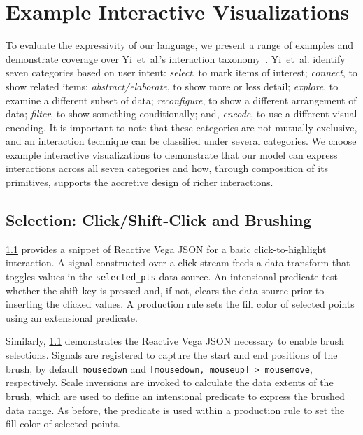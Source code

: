 \section{Example Interactive Visualizations}
\label{sec:vg:examples}

To evaluate the expressivity of our language, we present a range of examples and
demonstrate coverage over Yi~et~al.'s interaction
taxonomy~\cite{yi:understanding}. Yi~et~al. identify seven categories based on
user intent: \emph{select}, to mark items of interest; \emph{connect}, to show
related items; \emph{abstract/elaborate}, to show more or less detail;
\emph{explore}, to examine a different subset of data; \emph{reconfigure}, to
show a different arrangement of data; \emph{filter}, to show something
conditionally; and, \emph{encode}, to use a different visual encoding. It is
important to note that these categories are not mutually exclusive, and an
interaction technique can be classified under several categories. We choose
example interactive visualizations to demonstrate that our model can express
interactions across all seven categories and how, through composition of its
primitives, supports the accretive design of richer interactions.

\subsection{Selection: Click/Shift-Click and Brushing}

\cref{} provides a snippet of Reactive Vega JSON for a basic
click-to-highlight interaction. A signal constructed over a click stream feeds a
data transform that toggles values in the \texttt{selected\_pts} data source. An
intensional predicate test whether the shift key is pressed and, if not, clears
the data source prior to inserting the clicked values. A production rule sets
the fill color of selected points using an extensional predicate.

Similarly, \cref{} demonstrates the Reactive Vega JSON necessary to
enable brush selections. Signals are registered to capture the start and end
positions of the brush, by default \texttt{mousedown} and \texttt{[mousedown,
mouseup] > mousemove}, respectively. Scale inversions are invoked to calculate
the data extents of the brush, which are used to define an intensional predicate
to express the brushed data range. As before, the predicate is used within a
production rule to set the fill color of selected points.


